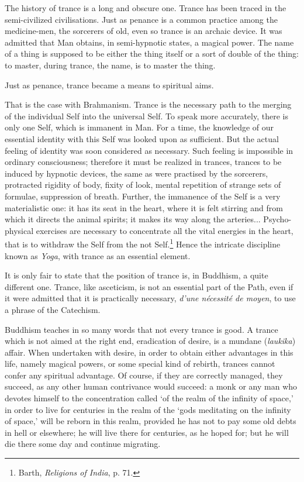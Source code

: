 \documentclass[a4paper, 11pt, oneside, english]{article}
\begin{document}
The history of trance is a long and obscure one. Trance has been traced in the semi-civilized civilisations. Just as penance is a common practice among the medicine-men, the sorcerers of old, even so trance is an archaic device. It was admitted that Man obtains, in semi-hypnotic states, a magical power. The name of a thing is supposed to be either the thing itself or a sort of double of the thing: to master, during trance, the name, is to master the thing.

Just as penance, trance became a means to spiritual aims.

That is the case with Brahmanism. Trance is the necessary path to the merging of the individual Self into the universal Self. To speak more accurately, there is only one Self, which is immanent in Man. For a time, the knowledge of our essential identity with this Self was looked upon as sufficient. But the actual feeling of identity was soon considered as necessary. Such feeling is impossible in ordinary consciousness; therefore it must be realized in trances, trances to be induced by hypnotic devices, the same as were practised by the sorcerers, protracted rigidity of body, fixity of look, mental repetition of strange sets of formulae, suppression of breath. Further, the immanence of the Self is a very materialistic one: it has its seat in the heart, where it is felt stirring and from which it directs the animal spirits; it makes its way along the arteries... Psycho-physical exercises are necessary to concentrate all the vital energies in the heart, that is to withdraw the Self from the not Self.\footnote{Barth, \emph{Religions of India}, p. 71.} Hence the intricate discipline known as \emph{Yoga}, with trance as an essential element.

It is only fair to state that the position of trance is, in Buddhism, a quite different one. Trance, like asceticism, is not an essential part of the Path, even if it were admitted that it is practically necessary, \emph{d'une nécessité de moyen}, to use a phrase of the Catechism.

Buddhism teaches in so many words that not every trance is good. A trance which is not aimed at the right end, eradication of desire, is a mundane (\emph{laukika}) affair. When undertaken with desire, in order to obtain either advantages in this life, namely magical powers, or some special kind of rebirth, trances cannot confer any spiritual advantage. Of course, if they are correctly managed, they succeed, as any other human contrivance would succeed: a monk or any man who devotes himself to the concentration called `of the realm of the infinity of space,' in order to live for centuries in the realm of the `gods meditating on the infinity of space,' will be reborn in this realm, provided he has not to pay some old debts in hell or elsewhere; he will live there for centuries, as he hoped for; but he will die there some day and continue migrating.
\end{document}
